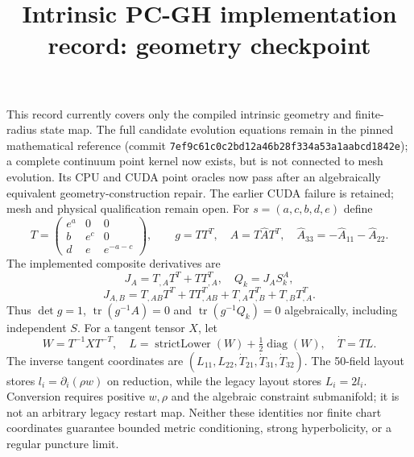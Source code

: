 \documentclass{article}
\begin{document}
\title{Intrinsic PC-GH implementation record: geometry checkpoint}
\maketitle
This record currently covers only the compiled intrinsic geometry and
finite-radius state map. The full candidate evolution equations remain in the
pinned mathematical reference (commit
\texttt{7ef9c61c0c2bd12a46b28f334a53a1aabcd1842e}); a complete continuum point kernel now exists, but is not connected to mesh evolution. Its CPU and CUDA point oracles now pass after an algebraically equivalent geometry-construction repair. The earlier CUDA failure is retained; mesh and physical qualification remain open.
For $s=(a,c,b,d,e)$ define
\[
 T=\begin{pmatrix}e^a&0&0\\b&e^c&0\\d&e&e^{-a-c}\end{pmatrix},\qquad
 g=TT^T,\quad A=T\widehat A T^T,\quad
 \widehat A_{33}=-\widehat A_{11}-\widehat A_{22}.
\]
The implemented composite derivatives are
\[
 J_A=T_{,A}T^T+TT_{,A}^T,\quad Q_k=J_A S_k^A,
\]
\[
 J_{A,B}=T_{,AB}T^T+TT_{,AB}^T+T_{,A}T_{,B}^T+T_{,B}T_{,A}^T.
\]
Thus $\det g=1$, $\operatorname{tr}(g^{-1}A)=0$ and
$\operatorname{tr}(g^{-1}Q_k)=0$ algebraically, including independent $S$.
For a tangent tensor $X$, let
\[
 W=T^{-1}XT^{-T},\quad
 L=\operatorname{strictLower}(W)+\tfrac12\operatorname{diag}(W),\quad
 \dot T=TL.
\]
The inverse tangent coordinates are
$(L_{11},L_{22},\dot T_{21},\dot T_{31},\dot T_{32})$.
The 50-field layout stores $l_i=\partial_i(\rho w)$ on reduction, while the
legacy layout stores $L_i=2l_i$. Conversion requires positive $w,\rho$ and the
algebraic constraint submanifold; it is not an arbitrary legacy restart map.
Neither these identities nor finite chart coordinates guarantee bounded metric
conditioning, strong hyperbolicity, or a regular puncture limit.
\end{document}
